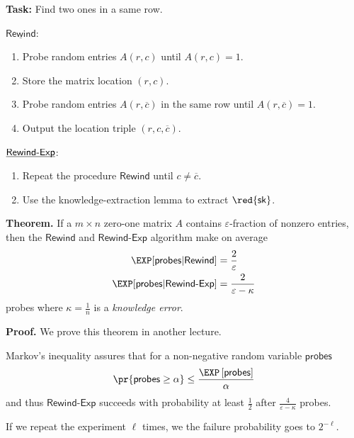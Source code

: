 \documentclass[landscape,footrule]{foils}
\newcommand{\probes}{\mathsf{probes}}
\renewcommand{\SK}{{\red{\mathsf{sk}}}}
\begin{document}


\textbf{Task:} Find two ones in a same row.

$\underline{\mathsf{Rewind}}$:
\begin{enumerate}
 \item Probe random entries $A(r,c)$ until $A(r,c)=1$.
 \item Store the matrix location $(r,c)$.
 \item Probe random entries $A(r,\overline{c})$ in the same row until $A(r,\overline{c})=1$.
 \item Output the location triple $(r,c,\overline{c})$.
\end{enumerate}
\vspace*{2cm}

$\underline{\smash{\mathsf{Rewind\text{-}Exp}}}$:
\begin{enumerate}
  \item Repeat the procedure $\mathsf{Rewind}$ until $c\neq \overline{c}$.
  \item Use the knowledge-extraction lemma to extract $\SK$.
\end{enumerate}


\textbf{Theorem.}  If a $m\times n$ zero-one matrix $A$ contains
$\varepsilon$-fraction of nonzero entries, then the $\mathsf{Rewind}$
and $\mathsf{Rewind\text{-}Exp}$ algorithm make on average
\begin{align*}
  \EXP[\probes| \mathsf{Rewind}] &=\frac{2}{\varepsilon}\\
  \EXP[\probes|\mathsf{Rewind\text{-}Exp}] &=\frac{2}{\varepsilon-\kappa}
\end{align*}
probes where $\kappa=\frac{1}{n}$ is a \emph{knowledge error}.

\textbf{Proof.} We prove this theorem in another lecture.


Markov's inequality assures that for a non-negative random variable $\probes$
\begin{align*}
  \pr{\probes\geq \alpha}\leq \frac{\E{\probes}}{\alpha}
\end{align*}
and thus $\mathsf{Rewind\text{-}Exp}$ succeeds with probability at
least $\frac{1}{2}$ after $\frac{4}{\varepsilon-\kappa}$ probes.

If we repeat the experiment $\ell$ times, we the failure probability
goes to $2^{-\ell}$.
\end{document}
